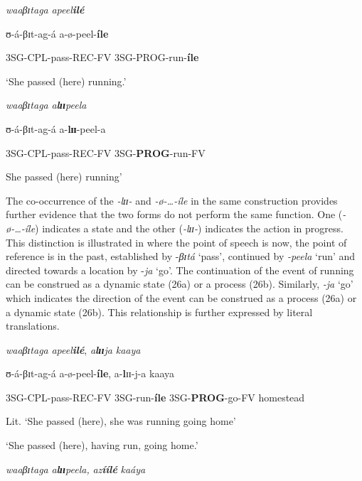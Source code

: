 \documentclass[output=paper]{langscibook}
\begin{document}
\ea
\ea \textit{waaβɪ}\textit{taga}                   \textit{apeel}\textbf{\textit{ilé}}

\textbf{    }ʊ-á-βɪt-ag-á                 a-ø-peel-\textbf{íle}

 3SG-CPL-pass-REC-FV 3SG-PROG-run-\textbf{íle}

 ‘She passed (here) running.’


\ex *\textit{waaβɪ}\textit{taga}                   \textit{a}\textbf{\textit{l}}\textbf{\textit{ɪɪ}}\textit{peela}

   ʊ-á-βɪt-ag-á                a-\textbf{lɪɪ}-peel-a

   3SG-CPL-pass-REC-FV 3SG-\textbf{PROG}-run-FV 

   She passed (here) running’
\z
\z

The co-occurrence of the \textit{-lɪɪ}\textit{-} and \textit{-ø}\textit{-…-íle} in the same construction provides further evidence that the two forms do not perform the same function. One (\textit{-ø}\textit{-…-íle}) indicates a state and the other (\textit{-lɪɪ}\textit{-}) indicates the action in progress. This distinction is illustrated in  where the point of speech is now, the point of reference is in the past, established by -\textit{βɪ}\textit{tá} ‘pass’, continued by \textit{-peela} ‘run’ and directed towards a location by -\textit{ja} ‘go’. The continuation of the event of running can be construed as a dynamic state (26a) or a process (26b). Similarly, \textit{-ja} ‘go’ which indicates the direction of the event can be construed as a process (26a) or a dynamic state (26b). This relationship is further expressed by literal translations. 

\ea
\ea

\textit{waaβɪ}\textit{taga}                   \textit{apeel}\textbf{\textit{ilé}},       \textit{a}\textbf{\textit{l}}\textbf{\textit{ɪɪ}}\textit{ja}                    \textit{kaaya} 

    ʊ-á-βɪt-ag-á                a-ø-peel-\textbf{íle}, a-\textbf{l}ɪɪ-j-a                 kaaya 

    3SG-CPL-pass-REC-FV 3SG-run-\textbf{íle}  3SG-\textbf{PROG}-go-FV homestead 


   Lit. ‘She passed (here), she was running going home’ 

   ‘She passed (here), having run, going home.’

\ex
\textit{waaβɪ}\textit{taga}                   \textit{a}\textbf{\textit{l}}\textbf{\textit{ɪɪ}}\textit{peela,}               \textit{az}\textbf{\textit{íílé}}         \textit{kaáya}
\end{document}
